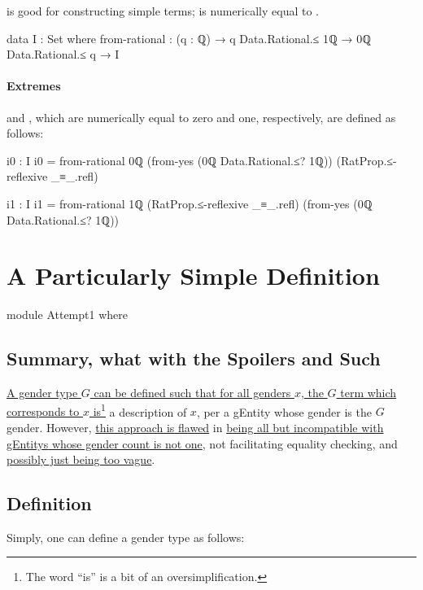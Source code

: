 \documentclass{article}
\theoremstyle{remark}
\newcommand{\summaryLink}[2]{\hyperref[#1]{#2}}
\begin{document}
 is good for constructing simple  terms;     is numerically equal to .

\begin{code}
data I : Set where
  from-rational :
    (q : ℚ) → q Data.Rational.≤ 1ℚ → 0ℚ Data.Rational.≤ q → I
\end{code}

\paragraph{Extremes}
 and , which are numerically equal to zero and one, respectively, are defined as follows:

\begin{code}
i0 : I
i0 = from-rational 0ℚ
                   (from-yes (0ℚ Data.Rational.≤? 1ℚ))
                   (RatProp.≤-reflexive _≡_.refl)

i1 : I
i1 = from-rational 1ℚ
                   (RatProp.≤-reflexive _≡_.refl)
                   (from-yes (0ℚ Data.Rational.≤? 1ℚ))
\end{code}

\section{A Particularly Simple Definition}

\begin{code}
module Attempt1 where
\end{code}

\subsection{Summary, what with the Spoilers and Such}
\summaryLink{sec:gender1definition}{A gender type \(G\) can be defined such that for all genders \(x\), the \(G\) term which corresponds to \(x\) is\footnote{The word ``is'' is a bit of an oversimplification.} a description of \(x\), per a \gls{gEntity} whose gender is the \(G\) gender.}  However, \summaryLink{sec:gender1flaws}{this approach is flawed} in \summaryLink{sec:gender1non1gender}{being all but incompatible with \glspl{gEntity} whose gender count is not one}, not facilitating equality checking, and \summaryLink{sec:gender1vagueness}{possibly just being too vague}.

\subsection{Definition}\label{sec:gender1definition}
Simply, one can define a gender type  as follows:
\end{document}
